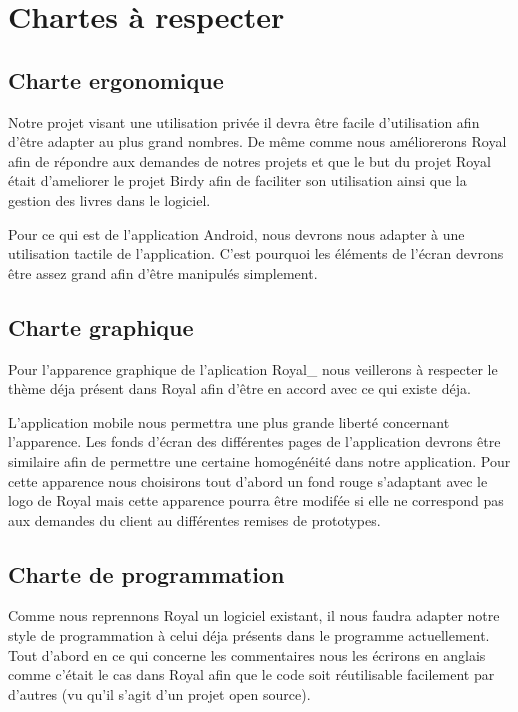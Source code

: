 \section{Chartes à respecter}

\subsection{Charte ergonomique}
Notre projet visant une utilisation privée il devra être facile d'utilisation afin d'être adapter au plus grand nombres.
De même comme nous améliorerons Royal afin de répondre aux demandes de notres projets et que le but du projet Royal était d'ameliorer le projet Birdy afin de faciliter son utilisation ainsi que la gestion des livres dans le logiciel.  

Pour ce qui est de l'application Android, nous devrons nous adapter à une utilisation tactile de l'application. 
C'est pourquoi les éléments de l'écran devrons être assez grand afin d'être manipulés simplement. 

\subsection{Charte graphique}
Pour l'apparence graphique de l'aplication Royal\_ nous veillerons à respecter le thème déja présent dans Royal afin d'être en accord avec ce qui existe déja.

L'application mobile nous permettra une plus grande liberté concernant l'apparence. 
Les fonds d'écran des différentes pages de l'application devrons être similaire afin de permettre une certaine homogénéité dans notre application.
Pour cette apparence nous choisirons tout d'abord un fond rouge s'adaptant avec le logo de Royal mais cette apparence pourra être modifée si elle ne correspond pas aux demandes du client au différentes remises de prototypes.

\subsection{Charte de programmation}

Comme nous reprennons Royal un logiciel existant, il nous faudra adapter notre style de programmation à celui déja présents dans le programme actuellement.
Tout d'abord en ce qui concerne les commentaires nous les écrirons en anglais comme c'était le cas dans Royal afin que le code soit réutilisable facilement par d'autres (vu qu'il s'agit d'un projet open source).

